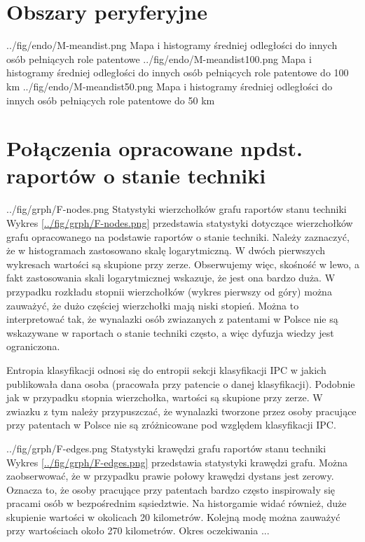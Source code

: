     \newpage\section
  {Obszary peryferyjne}

  \newpage\charttripled
{../fig/endo/M-meandist.png}
{ Mapa i histogramy średniej odległości do innych osób pełniących role patentowe }
{../fig/endo/M-meandist100.png}
{ Mapa i histogramy średniej odległości do innych osób pełniących role patentowe do 100 km }
{../fig/endo/M-meandist50.png}
{ Mapa i histogramy średniej odległości do innych osób pełniących role patentowe do 50 km }




    \newpage\section
  {Połączenia opracowane npdst. raportów o stanie techniki}


  \chartside
{../fig/grph/F-nodes.png}
{ Statystyki wierzchołków grafu raportów stanu techniki }
{ Wykres \cref{../fig/grph/F-nodes.png} przedstawia statystyki
  dotyczące wierzchołków grafu opracowanego na podstawie raportów
  o stanie techniki. Należy zaznaczyć, że w histogramach zastosowano
  skalę logarytmiczną. W dwóch pierwszych wykresach wartości są skupione
  przy zerze. Obserwujemy więc, skośność w lewo, a fakt zastosowania
  skali logarytmicznej wskazuje, że jest ona bardzo duża.
  W przypadku rozkładu stopnii wierzchołków (wykres pierwszy od góry)
  można zauważyć, że dużo częściej wierzchołki mają niski stopień.
  Można to interpretować tak, że wynalazki osób zwiazanych z patentami w Polsce
  nie są wskazywane w raportach o stanie techniki często, a więc dyfuzja wiedzy
  jest ograniczona. }

Entropia klasyfikacji odnosi się do entropii sekcji klasyfikacji \ac{IPC} w jakich
publikowała dana osoba (pracowała przy patencie o danej klasyfikacji).
Podobnie jak w przypadku stopnia wierzchołka, wartości są skupione przy zerze.
W zwiazku z tym należy przypuszczać, że wynalazki tworzone przez osoby
pracujące przy patentach w Polsce nie są zróżnicowane pod względem klasyfikacji \ac{IPC}.


\newpage

  \chartside
{../fig/grph/F-edges.png}
{ Statystyki krawędzi grafu raportów stanu techniki }
{ Wykres \cref{../fig/grph/F-edges.png} przedstawia statystyki krawędzi grafu.
  Można zaobserwować, że w przypadku prawie połowy krawędzi dystans jest zerowy.
  Oznacza to, że osoby pracujące przy patentach bardzo często inspirowały się
  pracami osób w bezpośrednim sąsiedztwie. Na historgamie widać również,
  duże skupienie wartości w okolicach 20 kilometrów. Kolejną modę można zauważyć
  przy wartościach około 270 kilometrów.
  Okres oczekiwania  ...}

